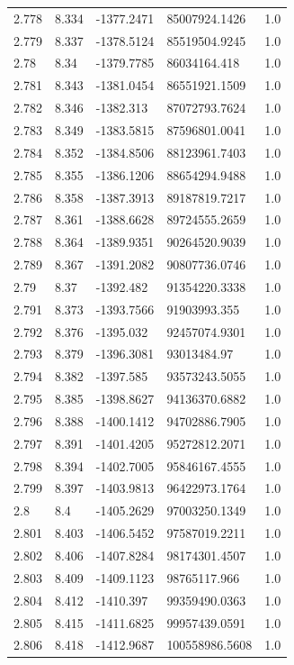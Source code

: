 \begin{tabular}{lllll}
2.778 & 8.334 & -1377.2471 & 85007924.1426 & 1.0 \\
2.779 & 8.337 & -1378.5124 & 85519504.9245 & 1.0 \\
2.78 & 8.34 & -1379.7785 & 86034164.418 & 1.0 \\
2.781 & 8.343 & -1381.0454 & 86551921.1509 & 1.0 \\
2.782 & 8.346 & -1382.313 & 87072793.7624 & 1.0 \\
2.783 & 8.349 & -1383.5815 & 87596801.0041 & 1.0 \\
2.784 & 8.352 & -1384.8506 & 88123961.7403 & 1.0 \\
2.785 & 8.355 & -1386.1206 & 88654294.9488 & 1.0 \\
2.786 & 8.358 & -1387.3913 & 89187819.7217 & 1.0 \\
2.787 & 8.361 & -1388.6628 & 89724555.2659 & 1.0 \\
2.788 & 8.364 & -1389.9351 & 90264520.9039 & 1.0 \\
2.789 & 8.367 & -1391.2082 & 90807736.0746 & 1.0 \\
2.79 & 8.37 & -1392.482 & 91354220.3338 & 1.0 \\
2.791 & 8.373 & -1393.7566 & 91903993.355 & 1.0 \\
2.792 & 8.376 & -1395.032 & 92457074.9301 & 1.0 \\
2.793 & 8.379 & -1396.3081 & 93013484.97 & 1.0 \\
2.794 & 8.382 & -1397.585 & 93573243.5055 & 1.0 \\
2.795 & 8.385 & -1398.8627 & 94136370.6882 & 1.0 \\
2.796 & 8.388 & -1400.1412 & 94702886.7905 & 1.0 \\
2.797 & 8.391 & -1401.4205 & 95272812.2071 & 1.0 \\
2.798 & 8.394 & -1402.7005 & 95846167.4555 & 1.0 \\
2.799 & 8.397 & -1403.9813 & 96422973.1764 & 1.0 \\
2.8 & 8.4 & -1405.2629 & 97003250.1349 & 1.0 \\
2.801 & 8.403 & -1406.5452 & 97587019.2211 & 1.0 \\
2.802 & 8.406 & -1407.8284 & 98174301.4507 & 1.0 \\
2.803 & 8.409 & -1409.1123 & 98765117.966 & 1.0 \\
2.804 & 8.412 & -1410.397 & 99359490.0363 & 1.0 \\
2.805 & 8.415 & -1411.6825 & 99957439.0591 & 1.0 \\
2.806 & 8.418 & -1412.9687 & 100558986.5608 & 1.0 \\

\end{tabular}

